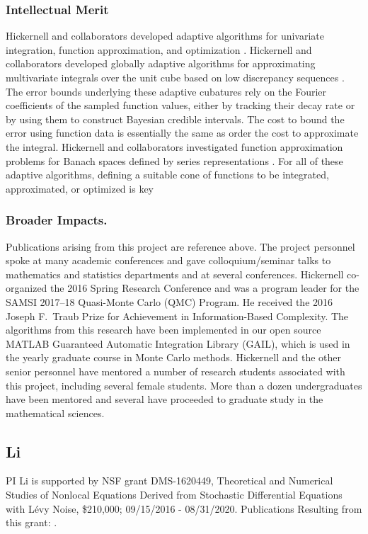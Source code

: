 \documentclass[11pt]{NSFamsart}
\begin{document}
{\subsubsection*{Intellectual Merit}
Hickernell and collaborators developed adaptive algorithms for univariate integration, function approximation, and optimization \cite{ChoEtal17a,HicEtal14b, Din15a, Ton14a, Zha18a}.
Hickernell and collaborators developed globally adaptive algorithms for approximating multivariate integrals over the unit cube based on low discrepancy sequences \cite{HicJim16a,HicEtal17a,JimHic16a,RatHic19a}.  The error bounds underlying these adaptive cubatures rely on the Fourier coefficients of the sampled function values, either by tracking their decay rate or by using them to construct Bayesian credible intervals. The cost to bound the error using function data is essentially the same as order the cost to approximate the integral. 
Hickernell and collaborators investigated function approximation problems for Banach spaces defined by series representations \cite{DinHic20a,DinEtal20a}.  For all of these adaptive algorithms, defining a suitable cone of functions to be integrated, approximated, or optimized is key

\subsubsection*{Broader Impacts.}
Publications arising from this project are reference above.  
The project personnel spoke at many academic conferences and gave colloquium/seminar talks to mathematics and statistics departments and at several conferences.  Hickernell co-organized the 2016 Spring Research Conference and was a program leader for the SAMSI 2017--18 Quasi-Monte Carlo (QMC) Program.   He received the 2016 Joseph F.\ Traub Prize for Achievement in Information-Based Complexity. The algorithms from this research have been implemented in our open source MATLAB Guaranteed Automatic Integration Library (GAIL), which is used in the yearly graduate course in Monte Carlo methods.  Hickernell and the other senior personnel have mentored a number of research students associated with this project, including several female students.  More than a dozen undergraduates have been mentored and several have proceeded to graduate study in the mathematical sciences. 

\subsection*{Li} PI Li is supported by NSF grant  DMS-1620449, Theoretical and Numerical Studies of Nonlocal Equations Derived from Stochastic Differential Equations with L\'evy Noise, \$210,000; 09/15/2016 - 08/31/2020. Publications Resulting from this grant:
 \cite{ChenWu, ChenXL2020,  DannyTesfay,GaoTing2016, Gao2016,    Liu2019LvyNI, Lv2016OnAS, QiaoDuan2018,Wang2018NumericalAF, YangDuanWiggins2020,ZhangZhuanDuan,ZhengDuan2017,ZhengYY2020}.

}
\end{document}
